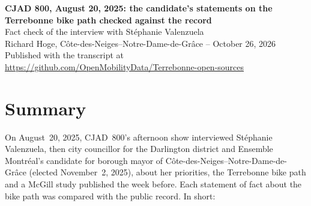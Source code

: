 \documentclass[11pt,letterpaper]{article}
\newcommand{\repourl}{https://github.com/OpenMobilityData/Terrebonne-open-sources}
\newcommand{\repo}[1]{\href{\repourl}{#1}}
\begin{document}
\begin{center}
{\Large\bfseries CJAD 800, August 20, 2025: the candidate's statements on the Terrebonne bike path checked against the record}\\[0.4em]
{\large Fact check of the interview with Stéphanie Valenzuela}\\[0.6em]
Richard Hoge, Côte-des-Neiges--Notre-Dame-de-Grâce -- October 26, 2026\\
Published with the transcript at \repo{\repourl}
\end{center}

\section*{Summary}

On August~20, 2025, CJAD~800's afternoon show interviewed Stéphanie
Valenzuela, then city councillor for the Darlington district and Ensemble
Montréal's candidate for borough mayor of Côte-des-Neiges--Notre-Dame-de-Grâce
(elected November~2, 2025), about her priorities, the Terrebonne bike path and
a McGill study published the week before. Each statement of fact about the
bike path was compared with the public record. In short:
\end{document}
